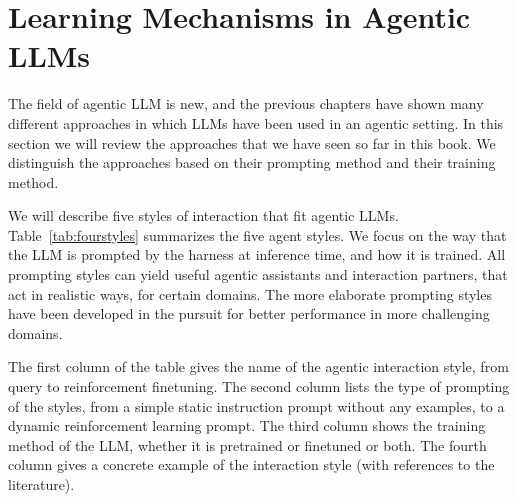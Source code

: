 \section{Learning Mechanisms in Agentic LLMs}\label{sec:styles}
The field of agentic LLM is new, and the previous chapters have shown many different approaches in which LLMs have been used in an agentic setting. In this section we will review the approaches that we have seen so far in this book. We distinguish the approaches based on their prompting method and their training method. 


We will describe five styles of interaction that fit agentic LLMs.
Table~\ref{tab:fourstyles} summarizes the five  agent styles. %
We focus on the way
that the LLM is prompted by the harness at inference time, and  how it is trained. All prompting styles can yield useful agentic assistants and interaction partners, that act in realistic ways, for certain domains. The more elaborate prompting styles have been developed in the pursuit for better performance in more challenging domains.

The first column of the table gives the name of the agentic
interaction style, from query to reinforcement finetuning. The second
column lists the type of prompting of the styles, from a simple static
instruction prompt without any examples, to a dynamic reinforcement
learning prompt. The third column shows the training method of the
LLM, whether it is pretrained or finetuned or both. The fourth column
gives a concrete  example of the interaction style (with references to the
literature). 

